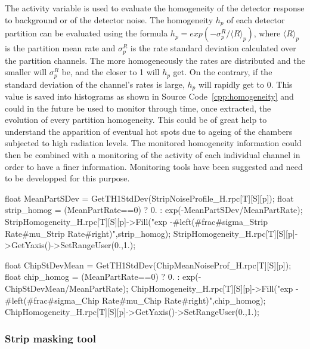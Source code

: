 	The activity variable is used to evaluate the homogeneity of the detector response to background or of the detector noise. The homogeneity $h_p$ of each detector partition can be evaluated using the formula $h_p = exp(-\sigma^{R}_p/\langle R\rangle_p)$, where $\langle R\rangle_p$ is the partition mean rate and $\sigma^{R}_p$ is the rate standard deviation calculated over the partition channels. The more homogeneously the rates are distributed and the smaller will $\sigma^{R}_p$ be, and the closer to 1 will $h_p$ get. On the contrary, if the standard deviation of the channel's rates is large, $h_p$ will rapidly get to 0. This value is saved into histograms as shown in Source Code~\ref{cpp:homogeneity} and could in the future be used to monitor through time, once extracted, the evolution of every partition homogeneity. This could be of great help to understand the apparition of eventual hot spots due to ageing of the chambers subjected to high radiation levels. The monitored homogeneity information could then be combined with a monitoring of the activity of each individual channel in order to have a finer information. Monitoring tools have been suggested and need to be developped for this purpose.\\
	
	\begin{code}
	\begin{cppcode}
float MeanPartSDev = GetTH1StdDev(StripNoiseProfile_H.rpc[T][S][p]);
float strip_homog = (MeanPartRate==0)
	? 0.
	: exp(-MeanPartSDev/MeanPartRate);
StripHomogeneity_H.rpc[T][S][p]->Fill("exp -#left(#frac{#sigma_{Strip Rate}}{#mu_{Strip Rate}}#right)",strip_homog);
StripHomogeneity_H.rpc[T][S][p]->GetYaxis()->SetRangeUser(0.,1.);

float ChipStDevMean = GetTH1StdDev(ChipMeanNoiseProf_H.rpc[T][S][p]);
float chip_homog = (MeanPartRate==0)
	? 0.
	: exp(-ChipStDevMean/MeanPartRate);
ChipHomogeneity_H.rpc[T][S][p]->Fill("exp -#left(#frac{#sigma_{Chip Rate}}{#mu_{Chip Rate}}#right)",chip_homog);
ChipHomogeneity_H.rpc[T][S][p]->GetYaxis()->SetRangeUser(0.,1.);
	\end{cppcode}
	\label{cpp:homogeneity}
	\vspace{5mm}
	\end{code}
		
		\subsubsection{Strip masking tool}
		\label{app2:sssec:mask}
	
